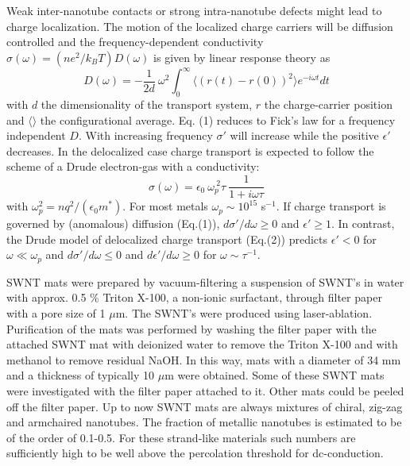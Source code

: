 \begin{multicols}{2}
Weak inter-nanotube contacts or strong intra-nanotube defects might lead to
charge localization.  The motion of the localized charge carriers will be
diffusion controlled and the frequency-dependent conductivity
$\sigma(\omega) = ({ne^2}/{k_B T})D(\omega)$ is given by linear response
theory as\cite{Scherlax73}
\begin{equation}
D(\omega) = -\frac{1}{2d}\: {\omega}^2 \int_{0}^{\infty}
\langle (r(t) - r(0))^2 \rangle e^{-i\omega t} dt
\end{equation}
with $d$ the dimensionality of the transport system, $r$  the
charge-carrier position and $\langle \rangle$ the configurational average.
Eq. (1) reduces to Fick's law for a frequency independent $D$.  With
increasing frequency $\sigma'$ will increase while the positive $\epsilon'$
decreases\cite{Schirmacher91,Adriaanse97}.  In the delocalized case
charge transport is expected to follow the scheme of a Drude electron-gas
with a conductivity:
\begin{equation}
\sigma(\omega) = \epsilon_0\:\omega_p^{\:2} \tau
\:\frac{1}{1+i\omega\tau}
\end{equation}
with $\omega_p^2 = {nq^2}/({\epsilon_0 m^*})$\cite{AM}.
For most metals $\omega_p \sim 10^{15}$ s$^{-1}$.  If charge transport is
governed by (anomalous) diffusion (Eq.(1)), $d\sigma'/d\omega \ge 0$ and
$\epsilon' \ge 1$. In contrast, the Drude model of delocalized charge
transport (Eq.(2)) predicts $\epsilon' < 0$ for $\omega\ll\omega_p$ and
$d\sigma'/d\omega \le 0$ and $d\epsilon'/d\omega \ge 0$ for $\omega \sim
\tau^{-1}$.


SWNT mats\cite{Rice99} were prepared by vacuum-filtering a suspension of
SWNT's in water with approx. 0.5 \% Triton X-100, a non-ionic surfactant,
through filter paper with a pore size of 1 $\mu$m. The SWNT's were
produced using laser-ablation\cite{Thess96}. Purification of the
mats was performed by washing the filter paper with the attached
SWNT mat with deionized water to remove the Triton X-100 and with
methanol to remove residual NaOH\cite{Rinzler98}. In this way,
mats with a diameter of 34 mm and a thickness of typically 10
$\mu$m were obtained. Some of these SWNT mats were investigated
with the filter paper attached to it. Other mats could be peeled
off the filter paper. Up to now SWNT mats are always mixtures of chiral,
zig-zag and armchaired nanotubes. The fraction of metallic nanotubes is
estimated to be of the order of 0.1-0.5\cite{Fischer97,Petit97,Ugawa99}.  For
these strand-like materials such numbers are sufficiently high to be well
above the percolation threshold for dc-conduction\cite{Adriaanse97}.



\end{multicols}
